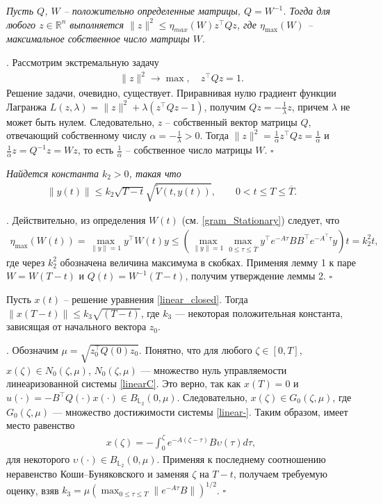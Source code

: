 \documentclass[../main.tex]{subfiles}
\begin{document}
\begin{lemma}
    {\it Пусть $Q$, $W$ -- положительно определенные матрицы, $Q = W^{-1}$. Тогда для любого $ z \in \mathbb{R}^n $ выполняется $\| z \|^2 \leqslant \eta_{max}(W)z^{\top}Qz$,
      где $\eta_{\max}(W) $ -- максимальное собственное число матрицы  $W$}.
\end{lemma}
\doc. 
Рассмотрим экстремальную задачу 
\begin{gather*}
\|z\|^2 \to \max , \quad z^{\top} Q z = 1. 
\end{gather*}
Решение задачи, очевидно, существует. Приравнивая нулю градиент функции Лагранжа $L(z,\lambda) = \| z\|^2 + \lambda (z^{\top}Qz - 1) $, получим $Qz = -\frac{1}{\lambda}z $, причем $\lambda$ не может быть нулем.
Следовательно, $ z $ -- собственный вектор матрицы $ Q $, отвечающий собственному числу $ \alpha = -\frac{1}{\lambda} >0  $.
Тогда $\| z \|^2 = \frac{1}{\alpha} z^{\top} Q z = \frac{1}{\alpha}$ и $\frac{1}{\alpha}z = Q^{-1} z = W z $, то есть $\frac{1}{\alpha} $ -- собственное число матрицы $ W $.
\hfill $\square$
\begin{lemma}
    {\it Найдется константа $k_2>0$, такая что      \begin{gather*}
        \| y(t) \| \leqslant k_2 \sqrt{T - t} \sqrt{\widetilde{V}(t,y(t))}, \qquad 0 < t \leqslant T \leqslant \overline{T}. \qquad 
    \end{gather*}}
\end{lemma}
\doc.
Действительно, из определения $W(t)$ (см. \eqref{gram_Stationary})  следует, что
\begin{gather*}
     \eta_{\max}(W(t)) = \max\limits_{\| y \| = 1} y^{\top} W(t) y \leqslant  \left(\max\limits_{\| y \| = 1} \max\limits_{0 \leqslant \tau  \leqslant \overline{T}} y^{\top} e^{-A\tau} B B^{\top} e^{-A^{\top}\tau} y\right)t = k_2^2 t,
\end{gather*}
где через $k_2^2$ обозначена величина максимума в скобках.
Применяя лемму 1 к паре $ W  = W(T - t) $ и $ Q(t) = W^{-1}(T - t) $, получим утверждение леммы 2.
\hfill $\square$
\begin{lemma}\label{lem3} Пусть $x(t)$ -- решение уравнения \eqref{linear_closed}.
Тогда $\|x(T - t) \| \leqslant k_3\sqrt{(T - t)} $, где $k_3$ --- некоторая положительная константа, зависящая  от  начального вектора $z_0$.
 \end{lemma} 
 \doc.
 Обозначим $\mu=\sqrt{z_0^\top Q(0)z_0}$. 
 Понятно, что для любого $\zeta \in [0,T]$, $x(\zeta) \in N_0(\zeta,\mu)$,   $N_0(\zeta,\mu)$ --- множество нуль управляемости линеаризованной системы \eqref{linearC}. Это верно, так как $x(T)=0$ и $u(\cdot)=-B^{\top}Q(\cdot)x(\cdot) \in B_{\mathbb{L}_2}(0,\mu)$.  
Следовательно, $x(\zeta) \in G_0(\zeta,\mu)$, где $G_0(\zeta,\mu)$ --- множество достижимости  системы  \eqref{linear-}. Таким образом, имеет место равенство
 \begin{gather*}
    x(\zeta)=-\int_{0}^{\zeta}e^{-A(\zeta-\tau)}B\upsilon(\tau)d\tau,  
 \end{gather*}
 для некоторого $\upsilon(\cdot) \in B_{\mathbb{ L}_2}(0,\mu)$. Применяя к последнему соотношению неравенство Коши--Буняковского и заменяя $\zeta$ на $T-t$, получаем требуемую оценку, взяв $k_3=\mu (\max_{0\leqslant \tau \leqslant T}\|e^{-A\tau}B\|)^{1/2}$.
\hfill $\square$
\end{document}
